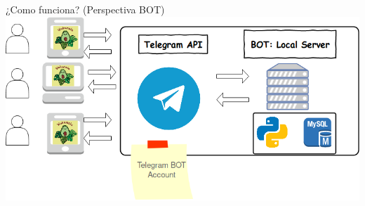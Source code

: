 \documentclass[bigger]{beamer}
\begin{document}
\begin{frame}{¿Como funciona? (Perspectiva BOT)}
	\centering
	\includegraphics[scale=0.4]{img/diagramawakamola}
\end{frame}
\end{document}
